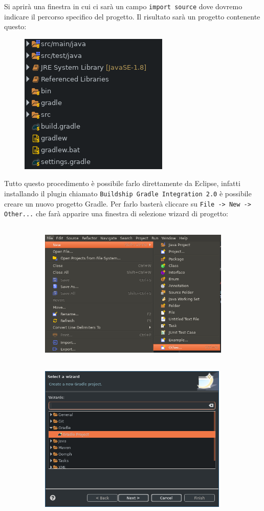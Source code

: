 Si aprirà una finestra in cui ci sarà un campo \texttt{import source} dove dovremo indicare il percorso specifico del progetto. Il risultato sarà un progetto contenente questo:
\begin{figure}[H]
    \centering
    \includegraphics[width=0.4\linewidth]{3DependencyManagement/eclipsePlugin/resultProject.png}
\end{figure}
Tutto questo procedimento è possibile farlo direttamente da Eclipse, infatti installando il plugin chiamato \texttt{Buildship Gradle Integration 2.0} è possibile creare un nuovo progetto Gradle. Per farlo basterà cliccare su \texttt{File -> New -> Other...} che farà apparire una finestra di selezione wizard di progetto:
\begin{figure}[H]
\begin{subfigure}{0.5\textwidth}
\includegraphics[width=0.9\linewidth, height=7cm]{3DependencyManagement/eclipsePlugin/newProject.png}
\end{subfigure}
\begin{subfigure}{0.5\textwidth}
\includegraphics[width=0.9\linewidth, height=7cm]{3DependencyManagement/eclipsePlugin/wizardGradle.png}
\end{subfigure}
\end{figure}
